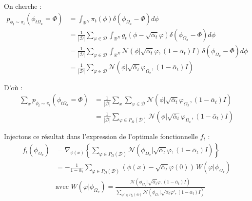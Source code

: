 \documentclass[a4paper,10pt]{article}
\theoremstyle{definition} %
\theoremstyle{definition} %
\theoremstyle{definition} %
\theoremstyle{definition} %
\begin{document}
On cherche :
\begin{align*}
    p_{\phi_t \sim \pi_t} \left( \phi_{t\Omega_x} = \Phi \right) &=
\int_{\mathbb{R}^N} \pi_t(\phi) \delta(\phi_{\Omega_x} - \Phi) d\phi \\
& = \frac{1}{|\mathcal{D}|} \sum\limits_{\varphi \in \mathcal{D}} \int_{\mathbb{R}^N} g_t (\phi - \sqrt{\bar \alpha_t} \varphi) \delta(\phi_{\Omega_x} - \Phi) d\phi\\
&= \frac{1}{|\mathcal{D}|} \sum\limits_{\varphi \in \mathcal{D}} \int_{\mathbb{R}^N} \mathcal{N} (\phi | \sqrt{\bar \alpha_t} \varphi, (1 - \bar \alpha_t) I)\, \delta(\phi_{\Omega_x} - \Phi) d\phi\\
&= \frac{1}{|\mathcal{D}|} \sum\limits_{\varphi \in \mathcal{D}} \mathcal{N} (\phi | \sqrt{\bar \alpha_t} \varphi_{\Omega_x}, (1 - \bar \alpha_t) I)
\end{align*}

D’où :
\begin{align*}
    \sum\limits_x p_{\phi_t \sim \pi_t} \left( \phi_{t\Omega_x} = \Phi \right) &= \frac{1}{|\mathcal{D}|} \sum\limits_x \sum\limits_{\varphi \in \mathcal{D}} \mathcal{N} (\phi | \sqrt{\bar \alpha_t} \varphi_{\Omega_x}, (1 - \bar \alpha_t) I)\\
    &=\frac{1}{|\mathcal{D}|} \sum\limits_{\varphi \in P_\Omega(\mathcal{D})} \mathcal{N} (\phi | \sqrt{\bar \alpha_t} \varphi_{\Omega_x}, (1 - \bar \alpha_t) I)
\end{align*}

Injectons ce résultat dans l’expression de l’optimale fonctionnelle \( f_t \) :
\begin{align*}
f_t(\phi_{\Omega_x}) &= \nabla_{\phi(x)} \left\{ \sum\limits_{\varphi \in P_\Omega(\mathcal{D})} \mathcal{N} (\phi_{\Omega_x} | \sqrt{\bar \alpha_t} \varphi, (1 - \bar \alpha_t) I) \right\}\\
&= -\frac{1}{1 - \bar \alpha_t}\sum\limits_{\varphi \in P_\Omega(\mathcal{D})}  \left(\phi(x) - \sqrt{\bar \alpha_t} \varphi(0)\right)\, W(\varphi | \phi_{\Omega_x})\\
& \text{avec } W(\varphi | \phi_{\Omega_x}) = \frac{\mathcal{N} (\phi_{\Omega_x} | \sqrt{\bar \alpha_t} \varphi, (1 - \bar \alpha_t) I)}
{\sum\limits_{\varphi' \in P_\Omega(\mathcal{D})} \mathcal{N} (\phi_{\Omega_x} | \sqrt{\bar \alpha_t} \varphi', (1 - \bar \alpha_t) I)}
\end{align*}
\end{document}

